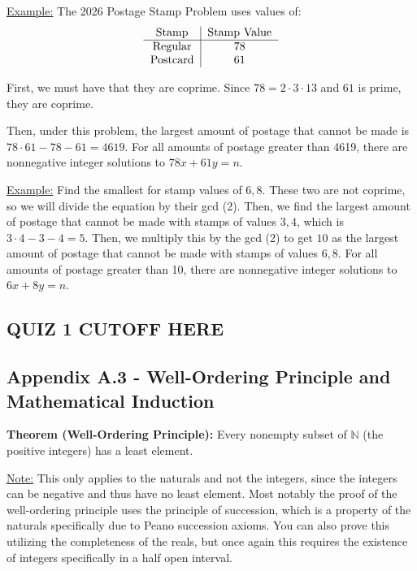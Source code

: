 \documentclass{article}
\begin{document}
\underline{Example:} The 2026 Postage Stamp Problem uses values of: \begin{align*}
    \begin{tabular}{c|c}
        \text{Stamp} & \text{Stamp Value}\\
        \hline
        \text{Regular} & 78\\
        \text{Postcard} & 61
    \end{tabular}
\end{align*}

First, we must have that they are coprime. Since $78=2\cdot 3\cdot 13$ and $61$ is prime, they are coprime.

Then, under this problem, the largest amount of postage that cannot be made is $78\cdot 61 - 78 - 61 = 4619$. For all amounts of postage greater than 4619, there are nonnegative integer solutions to $78x+61y=n$.

\underline{Example:} Find the smallest for stamp values of $6, 8$. These two are not coprime, so we will divide the equation by their gcd (2). Then, we find the largest amount of postage that cannot be made with stamps of values $3,4$, which is $3\cdot 4 - 3 - 4 = 5$. Then, we multiply this by the gcd (2) to get $10$ as the largest amount of postage that cannot be made with stamps of values $6,8$. For all amounts of postage greater than 10, there are nonnegative integer solutions to $6x+8y=n$.

\subsection{QUIZ 1 CUTOFF HERE}

\subsection{Appendix A.3 - Well-Ordering Principle and Mathematical Induction}

\textbf{Theorem (Well-Ordering Principle):} Every nonempty subset of $\mathbb{N}$ (the positive integers) has a least element.

\underline{Note:} This only applies to the naturals and not the integers, since the integers can be negative and thus have no least element. Most notably the proof of the well-ordering principle uses the principle of succession, which is a property of the naturals specifically due to Peano succession axioms. You can also prove this utilizing the completeness of the reals, but once again this requires the existence of integers specifically in a half open interval.
\end{document}
